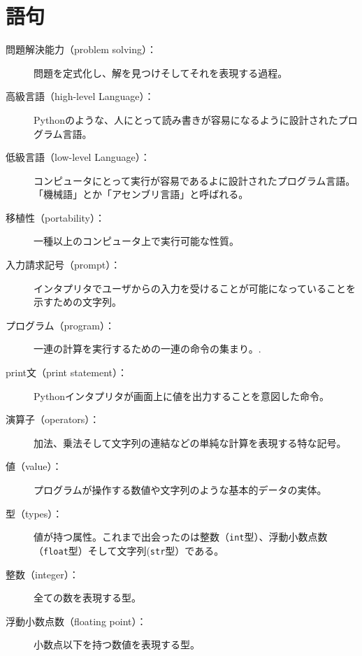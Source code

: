 \documentclass[a4j,12pt,makeidx]{jbook}
\begin{document}
\section{語句}
\begin{description}

\item[問題解決能力（problem solving）：]問題を定式化し、解を見つけそしてそれを表現する過程。

\item[高級言語（high-level Language）：]Pythonのような、人にとって読み書きが容易になるように設計されたプログラム言語。

\item[低級言語（low-level Language）：]コンピュータにとって実行が容易であるよに設計されたプログラム言語。「機械語」とか「アセンブリ言語」と呼ばれる。

\item[移植性（portability）：]一種以上のコンピュータ上で実行可能な性質。

\item[入力請求記号（prompt）：] インタプリタでユーザからの入力を受けることが可能になっていることを示すための文字列。

\item[プログラム（program）：] 一連の計算を実行するための一連の命令の集まり。.

\item[print文（print statement）：]Pythonインタプリタが画面上に値を出力することを意図した命令。 

\item[演算子（operators）：]加法、乗法そして文字列の連結などの単純な計算を表現する特な記号。

\item[値（value）：]プログラムが操作する数値や文字列のような基本的データの実体。

\item[型（types）：] 値が持つ属性。これまで出会ったのは整数（{\tt int}型）、浮動小数点数（{\tt float}型）そして文字列({\tt str}型）である。

\item[整数（integer）：]全ての数を表現する型。

\item[浮動小数点数（floating point）：]小数点以下を持つ数値を表現する型。


\end{description}
\end{document}
